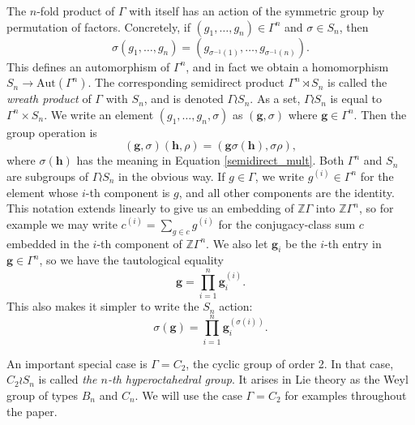 The $n$-fold product of $\Gamma$ with itself has an action of the symmetric group by permutation of factors. Concretely, if $(g_1, \ldots, g_n) \in \Gamma^n$ and $\sigma \in S_n$, then
\begin{equation} \label{semidirect_mult}
\sigma (g_1, \ldots, g_n) = (g_{\sigma^{-1}(1)}, \ldots, g_{\sigma^{-1}(n)}).
\end{equation}
This defines an automorphism of $\Gamma^n$, and in fact we obtain a homomorphism $S_n \to \mathrm{Aut}(\Gamma^n)$. The corresponding semidirect product $\Gamma^n \rtimes S_n$ is called the \emph{wreath product} of $\Gamma$ with $S_n$, and is denoted $\Gamma \wr S_n$. As a set, $\Gamma \wr S_n$ is equal to $\Gamma^n \times S_n$. We write an element $(g_1, \ldots, g_n, \sigma)$ as $(\mathbf{g}, \sigma)$ where $\mathbf{g} \in \Gamma^n$. Then the group operation is
\[
(\mathbf{g}, \sigma) (\mathbf{h}, \rho) = (\mathbf{g} \sigma(\mathbf{h}), \sigma \rho),
\]
where $\sigma(\mathbf{h})$ has the meaning in Equation \eqref{semidirect_mult}. Both $\Gamma^n$ and $S_n$ are subgroups of $\Gamma \wr S_n$ in the obvious way. If $g \in \Gamma$, we write $g^{(i)} \in \Gamma^n$ for the element whose $i$-th component is $g$, and all other components are the identity. This notation extends linearly to give us an embedding of $\mathbb{Z}\Gamma$ into $\mathbb{Z}\Gamma^n$, so for example we may write $c^{(i)} = \sum_{g \in c} g^{(i)}$ for the conjugacy-class sum $c$ embedded in the $i$-th component of $\mathbb{Z}\Gamma^n$. We also let $\mathbf{g}_i$ be the $i$-th entry in $\mathbf{g} \in \Gamma^n$, so we have the tautological equality
\[
\mathbf{g} = \prod_{i=1}^n \mathbf{g}_i^{(i)}.
\]
This also makes it simpler to write the $S_n$ action:
\[
\sigma(\mathbf{g}) = \prod_{i=1}^n \mathbf{g}_{i}^{(\sigma(i))}.
\]
\begin{example}
An important special case is $\Gamma = C_2$, the cyclic group of order 2. In that case, $C_2 \wr S_n$ is called \emph{the $n$-th hyperoctahedral group}. It arises in Lie theory as the Weyl group of types $B_n$ and $C_n$. We will use the case $\Gamma = C_2$ for examples throughout the paper.
\end{example}

